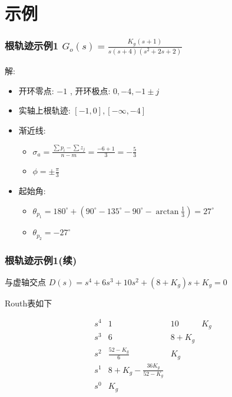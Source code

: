 \documentclass{beamer}
\begin{document}
\section{示例}
\label{sec-2}
\begin{frame}
\frametitle{根轨迹示例1 $G_o(s) = \frac{K_g(s+1)}{s(s+4)(s^2+2s+2)}$}
\label{sec-2-1}


解:
\begin{itemize}
\item <2->开环零点: $-1$ , 开环极点: $0,-4,-1\pm j$
\item <3->实轴上根轨迹:  $[-1,0],[-\infty,-4]$
\item <4->渐近线:
\begin{itemize}
\item $\sigma_a=\frac{\sum p_i-\sum z_j}{n-m}=\frac{-6+1}{3}=-\frac{5}{3}$
\item $\phi=\pm\frac{\pi}{3}$
\end{itemize}
\item <5->起始角:
\begin{itemize}
\item $\theta_{p_1}=180^{\circ}+(90^{\circ}-135^{\circ}-90^{\circ}-\arctan\frac{1}{3})=27^{\circ}$
\item $\theta_{p_2}=-27^{\circ}$
\end{itemize}
\end{itemize}
\end{frame}
\begin{frame}
\frametitle{根轨迹示例1(续)}
\label{sec-2-2}

 与虚轴交点  $D(s)=s^4+6s^3+10s^2+(8+K_g)s+K_g =0$ 
\begin{block}{Routh表如下}
\label{sec-2-2-1}

       \[\begin{matrix}
       s^4 & 1 & 10 & K_g \\
       s^3 & 6 & 8+K_g \\
       s^2 & \frac{52-K_g}{6} & K_g \\
       s^1 & 8+K_g-\frac{36K_g}{52-K_g} \\
       s^0 & K_g
       \end{matrix}\]
\end{block}
\end{frame}
\end{document}
